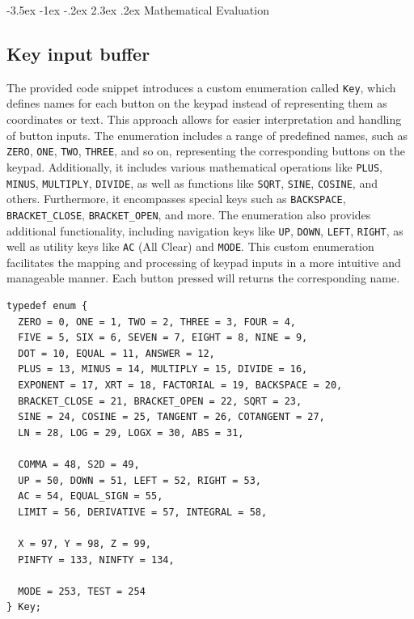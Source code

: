\documentclass[a4paper, twoside]{report}
\makeatletter
\newenvironment{code}{\captionsetup{type=listing}}{}
\renewcommand\section{\@startsection {section}{1}{-1em}%
  {-3.5ex \@plus -1ex \@minus -.2ex}%
  {2.3ex \@plus.2ex}%
  {\normalfont\Large\bfseries}}
\makeatother
\begin{document}
\newpage
\section{Mathematical Evaluation}
\subsection{Key input buffer}
The provided code snippet introduces a custom enumeration called \texttt{Key}, which defines names for each button on the keypad instead of representing them as coordinates or text. This approach allows for easier interpretation and handling of button inputs. The enumeration includes a range of predefined names, such as \texttt{ZERO}, \texttt{ONE}, \texttt{TWO}, \texttt{THREE}, and so on, representing the corresponding buttons on the keypad. Additionally, it includes various mathematical operations like \texttt{PLUS}, \texttt{MINUS}, \texttt{MULTIPLY}, \texttt{DIVIDE}, as well as functions like \texttt{SQRT}, \texttt{SINE}, \texttt{COSINE}, and others. Furthermore, it encompasses special keys such as \texttt{BACKSPACE}, \texttt{BRACKET\_CLOSE}, \texttt{BRACKET\_OPEN}, and more. The enumeration also provides additional functionality, including navigation keys like \texttt{UP}, \texttt{DOWN}, \texttt{LEFT}, \texttt{RIGHT}, as well as utility keys like \texttt{AC} (All Clear) and \texttt{MODE}. This custom enumeration facilitates the mapping and processing of keypad inputs in a more intuitive and manageable manner. Each button pressed will returns the corresponding name.

\begin{code}
\begin{verbatim}
typedef enum {
  ZERO = 0, ONE = 1, TWO = 2, THREE = 3, FOUR = 4,
  FIVE = 5, SIX = 6, SEVEN = 7, EIGHT = 8, NINE = 9,
  DOT = 10, EQUAL = 11, ANSWER = 12,
  PLUS = 13, MINUS = 14, MULTIPLY = 15, DIVIDE = 16,
  EXPONENT = 17, XRT = 18, FACTORIAL = 19, BACKSPACE = 20,
  BRACKET_CLOSE = 21, BRACKET_OPEN = 22, SQRT = 23,
  SINE = 24, COSINE = 25, TANGENT = 26, COTANGENT = 27,
  LN = 28, LOG = 29, LOGX = 30, ABS = 31,

  COMMA = 48, S2D = 49,
  UP = 50, DOWN = 51, LEFT = 52, RIGHT = 53,
  AC = 54, EQUAL_SIGN = 55,
  LIMIT = 56, DERIVATIVE = 57, INTEGRAL = 58,

  X = 97, Y = 98, Z = 99,
  PINFTY = 133, NINFTY = 134,

  MODE = 253, TEST = 254
} Key;
\end{verbatim}
\end{code}
\end{document}
